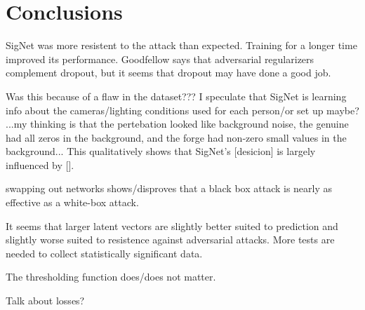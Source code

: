 \section{Conclusions}\label{sec:conclusion}

SigNet was more resistent to the attack than expected.
Training for a longer time improved its performance.
Goodfellow says that adversarial regularizers complement dropout, but it seems that dropout may have done a good job.

Was this because of a flaw in the dataset???
I speculate that SigNet is learning info about the cameras/lighting conditions used for each person/or set up maybe?
...my thinking is that the pertebation looked like background noise, the genuine had all zeros in the background, and the forge had non-zero small values in the background...
This qualitatively shows that SigNet's [desicion] is largely influenced by [].

swapping out networks shows/disproves that a black box attack is nearly as effective as a white-box attack.

It seems that larger latent vectors are slightly better suited to prediction and slightly worse suited to resistence against adversarial attacks.
More tests are needed to collect statistically significant data.

The thresholding function does/does not matter.

Talk about losses?

